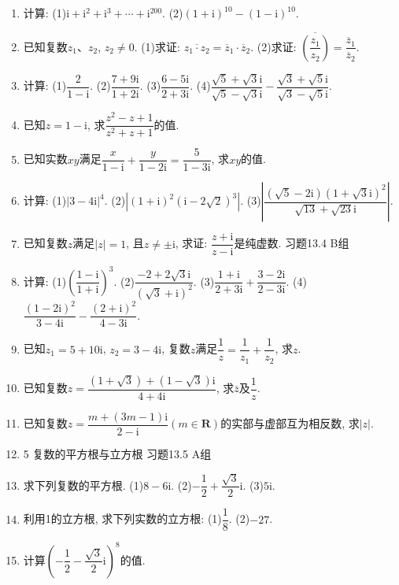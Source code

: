 \documentclass[10pt,a4paper]{article}
\begin{document}
\begin{enumerate}[1.]
\item 计算:
(1)$\mathrm{i}+\mathrm{i}^2+\mathrm{i}^3+\cdots +\mathrm{i}^{200}$.					(2)$(1+\mathrm{i})^{10}-(1-\mathrm{i})^{10}$.
\item 已知复数$z_1$、$z_2$, $z_2\ne 0$.
(1)求证: $\overline {z_1\cdot z_2}=\overline z_1\cdot \overline z_2$.
(2)求证: $\overline {(\dfrac{z_1}{z_2})}=\dfrac{{{\overline z}_1}}{{{\overline z}_2}}$.
\item 计算:
(1)$\dfrac 2{1-\mathrm{i}}$.								(2)$\dfrac{7+9\mathrm{i}}{1+2\mathrm{i}}$.
(3)$\dfrac{6-5\mathrm{i}}{2+3\mathrm{i}}$.								(4)$\dfrac{\sqrt 5+\sqrt 3\mathrm{i}}{\sqrt 5-\sqrt 3\mathrm{i}}-\dfrac{\sqrt 3+\sqrt 5\mathrm{i}}{\sqrt 3-\sqrt 5\mathrm{i}}$.
\item 已知$z=1-\mathrm{i}$, 求$\dfrac{{z^2}-z+1}{{z^2}+z+1}$的值.
\item 已知实数$xy$满足$\dfrac x{1-\mathrm{i}}+\dfrac y{1-2\mathrm{i}}=\dfrac 5{1-3\mathrm{i}}$, 求$xy$的值.
\item 计算:
(1)$|3-4\mathrm{i}|^4$.							(2)$|(1+\mathrm{i})^2(\mathrm{i}-2\sqrt 2)^3|$.
(3)$|\dfrac{(\sqrt 5-2\mathrm{i}){{(1+\sqrt 3\mathrm{i})}^2}}{\sqrt {13}+\sqrt {23}\mathrm{i}}|$.
\item 已知复数$z$满足$|z|=1$, 且$z\ne \pm \mathrm{i}$, 求证: $\dfrac{z+{\mathrm{i}}}{z-{\mathrm{i}}}$是纯虚数.
习题13.4  B组
\item 计算:
(1)$(\dfrac{1-\mathrm{i}}{1+\mathrm{i}})^3$.							(2)$\dfrac{-2+2\sqrt 3\mathrm{i}}{{{(\sqrt 3+\mathrm{i})}^2}}$.
(3)$\dfrac{1+\mathrm{i}}{2+3\mathrm{i}}+\dfrac{3-2\mathrm{i}}{2-3\mathrm{i}}$.						(4)$\dfrac{{{(1-2\mathrm{i})}^2}}{3-4\mathrm{i}}-\dfrac{{{(2+\mathrm{i})}^2}}{4-3\mathrm{i}}$.
\item 已知$z_1=5+10\mathrm{i}$, $z_2=3-4\mathrm{i}$, 复数$z$满足$\dfrac 1z=\dfrac 1{z_1}+\dfrac 1{z_2}$, 求$z$.
\item 已知复数$z=\dfrac{(1+\sqrt 3)+(1-\sqrt 3)\mathrm{i}}{4+4\mathrm{i}}$, 求$\overline z$及$\dfrac 1z$.
\item 已知复数$z=\dfrac{m+(3m-1){\mathrm{i}}}{2-{\mathrm{i}}}(m\in \mathbf{R})$的实部与虚部互为相反数, 求$|z|$.
\item 5  复数的平方根与立方根
习题13.5  A组
\item 求下列复数的平方根.
(1)$8-6\mathrm{i}$.								(2)$-\dfrac 12+\dfrac{\sqrt 3}2\mathrm{i}$.
(3)$5\mathrm{i}$.	
\item 利用1的立方根, 求下列实数的立方根:
(1)$\dfrac 18$.									(2)$-27$.
\item 计算$(-\dfrac 12-\dfrac{\sqrt 3}2\mathrm{i})^8$的值.

\end{enumerate}
\end{document}
